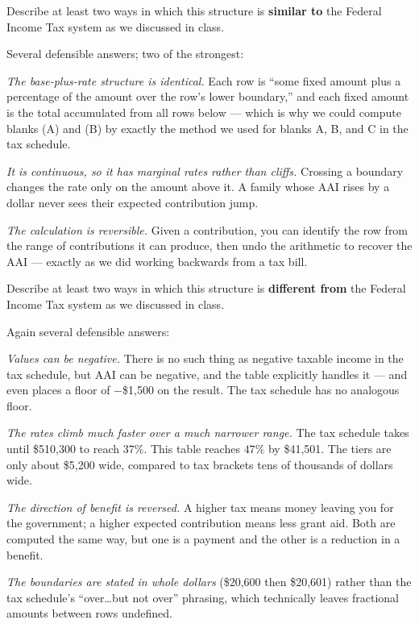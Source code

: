 \documentclass[12pt]{ximera}
\begin{document}
\begin{problem}
Describe at least two ways in which this structure is \textbf{similar to} the Federal
Income Tax system as we discussed in class.

\begin{freeResponse}
\end{freeResponse}

\begin{solution}
Several defensible answers; two of the strongest:

\emph{The base-plus-rate structure is identical.} Each row is ``some fixed amount plus a
percentage of the amount over the row's lower boundary,'' and each fixed amount is the
total accumulated from all rows below --- which is why we could compute blanks (A) and
(B) by exactly the method we used for blanks A, B, and C in the tax schedule.

\emph{It is continuous, so it has marginal rates rather than cliffs.} Crossing a boundary
changes the rate only on the amount above it. A family whose AAI rises by a dollar never
sees their expected contribution jump.

\emph{The calculation is reversible.} Given a contribution, you can identify the row from
the range of contributions it can produce, then undo the arithmetic to recover the AAI ---
exactly as we did working backwards from a tax bill.
\end{solution}
\end{problem}

\begin{problem}
Describe at least two ways in which this structure is \textbf{different from} the
Federal Income Tax system as we discussed in class.

\begin{freeResponse}
\end{freeResponse}

\begin{solution}
Again several defensible answers:

\emph{Values can be negative.} There is no such thing as negative taxable income in the
tax schedule, but AAI can be negative, and the table explicitly handles it --- and even
places a floor of $-$\$1,500 on the result. The tax schedule has no analogous floor.

\emph{The rates climb much faster over a much narrower range.} The tax schedule takes
until \$510,300 to reach $37\%$. This table reaches $47\%$ by \$41,501. The tiers are
only about \$5,200 wide, compared to tax brackets tens of thousands of dollars wide.

\emph{The direction of benefit is reversed.} A higher tax means money leaving you for the
government; a higher expected contribution means less grant aid. Both are computed the
same way, but one is a payment and the other is a reduction in a benefit.

\emph{The boundaries are stated in whole dollars} (\$20,600 then \$20,601) rather than
the tax schedule's ``over\ldots but not over'' phrasing, which technically leaves
fractional amounts between rows undefined.
\end{solution}
\end{problem}
\end{document}
